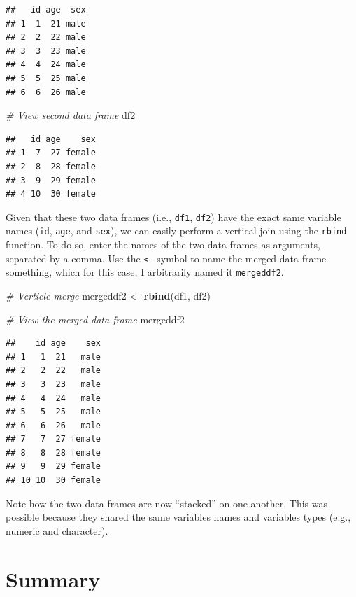 \documentclass[]{book}
\newenvironment{Shaded}{\begin{snugshade}}{\end{snugshade}}
\newcommand{\KeywordTok}[1]{\textcolor[rgb]{0.13,0.29,0.53}{\textbf{#1}}}
\newcommand{\StringTok}[1]{\textcolor[rgb]{0.31,0.60,0.02}{#1}}
\newcommand{\CommentTok}[1]{\textcolor[rgb]{0.56,0.35,0.01}{\textit{#1}}}
\newcommand{\NormalTok}[1]{#1}
\begin{document}
\begin{verbatim}
##   id age  sex
## 1  1  21 male
## 2  2  22 male
## 3  3  23 male
## 4  4  24 male
## 5  5  25 male
## 6  6  26 male
\end{verbatim}

\begin{Shaded}
\begin{Highlighting}[]
\CommentTok{# View second data frame}
\NormalTok{df2}
\end{Highlighting}
\end{Shaded}

\begin{verbatim}
##   id age    sex
## 1  7  27 female
## 2  8  28 female
## 3  9  29 female
## 4 10  30 female
\end{verbatim}

Given that these two data frames (i.e., \texttt{df1}, \texttt{df2}) have
the exact same variable names (\texttt{id}, \texttt{age}, and
\texttt{sex}), we can easily perform a vertical join using the
\texttt{rbind} function. To do so, enter the names of the two data
frames as arguments, separated by a comma. Use the \texttt{\textless{}-}
symbol to name the merged data frame something, which for this case, I
arbitrarily named it \texttt{mergeddf2}.

\begin{Shaded}
\begin{Highlighting}[]
\CommentTok{# Verticle merge}
\NormalTok{mergeddf2 <-}\StringTok{ }\KeywordTok{rbind}\NormalTok{(df1, df2)}

\CommentTok{# View the merged data frame}
\NormalTok{mergeddf2}
\end{Highlighting}
\end{Shaded}

\begin{verbatim}
##    id age    sex
## 1   1  21   male
## 2   2  22   male
## 3   3  23   male
## 4   4  24   male
## 5   5  25   male
## 6   6  26   male
## 7   7  27 female
## 8   8  28 female
## 9   9  29 female
## 10 10  30 female
\end{verbatim}

Note how the two data frames are now ``stacked'' on one another. This
was possible because they shared the same variables names and variables
types (e.g., numeric and character).

\section{Summary}\label{summary}
\end{document}
